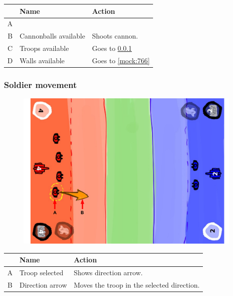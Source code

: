 \documentclass[12pt,a4paper]{article}
\begin{document}
\begin{table}[H]
\small
\centering
\begin{tabular}{c|p{5cm}|p{7cm}}
& Name & Action \\ \hline\hline
A
&
&
\\B
&Cannonballs available 
&Shoots cannon.
\\C
&Troops available
&Goes to \ref{mock:764}
\\D
&Walls available
&Goes to \ref{mock:766}
\end{tabular}
\end{table}


\subsubsection{Soldier movement}\label{mock:764}

\begin{figure}[H]
  \centering
  \includegraphics[width=11cm]{pic/mocks/6-4.pdf}
\end{figure}

\begin{table}[H]
\small
\centering
\begin{tabular}{c|p{5cm}|p{7cm}}
& Name & Action \\ \hline\hline
A
&Troop selected
&Shows direction arrow.
\\B
&Direction arrow 
&Moves the troop in the selected direction.
\end{tabular}
\end{table}


\newpage
\end{document}
